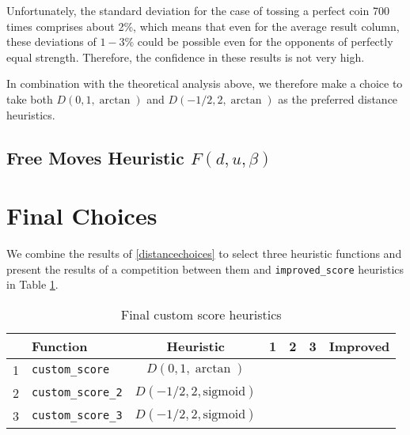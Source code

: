 \documentclass[oneside]{article}   	%
\begin{document}
Unfortunately, the standard deviation for the case of tossing a perfect coin 700 times comprises about 2\%, which means that even for the average result column, these deviations of $1-3\%$ could be possible even for the opponents of perfectly equal strength. Therefore, the confidence in these results is not very high.

In combination with the theoretical analysis above, we therefore make a choice to take both $D(0, 1, \arctan)$ and $D(-1/2, 2, \arctan)$ as the preferred distance heuristics.


\subsection{Free Moves Heuristic $F(d, u, \beta)$}


\section{Final Choices}


We combine the results of \ref{distancechoices} to select three heuristic functions and present the  results of a competition between them and \texttt{improved\_score} heuristics in Table \ref{FinalCompetition}.

\begin{table}[htp]
\caption{Final custom score heuristics}
\begin{center}
\begin{tabular}{clc|cccc}
   & Function & Heuristic & 1 & 2 & 3 & Improved \\
   \hline
1 & \texttt{custom\_score}    & $D(0, 1, \arctan)$             & & & &  \\
2 & \texttt{custom\_score\_2} & $D(-1/2, 2, \mathrm{sigmoid})$ & & & & \\
3 & \texttt{custom\_score\_3} & $D(-1/2, 2, \mathrm{sigmoid})$ & & & &
\end{tabular}
\end{center}
\label{FinalCompetition}
\end{table}%
\end{document}
